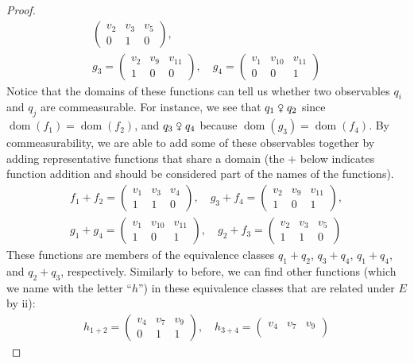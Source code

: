 \documentclass{scrartcl}
\DeclareMathOperator{\dom}{dom}
\newcommand{\com}{\mathrel{\venus}}
\begin{document}
\begin{examples}
\begin{enumerate}[(1)]
\begin{proof}
\begin{align*}
\begin{pmatrix}
v_2 & v_3 & v_5\\
0 & 1 & 0
\end{pmatrix},\\
g_3=\begin{pmatrix}
v_2 & v_9 & v_{11}\\
1 & 0 & 0
\end{pmatrix},\quad g_4=\begin{pmatrix}
v_1 & v_{10} & v_{11}\\
0 & 0 & 1
\end{pmatrix}
\end{align*}
Notice that the domains of these functions can tell us whether two observables $q_i$ and $q_j$ are commeasurable. For instance, we see that $q_1\com q_2$ since $\dom(f_1)=\dom(f_2)$, and $q_3\com q_4$ because $\dom(g_3)=\dom(f_4)$. By commeasurability, we are able to add some of these observables together by adding representative functions that share a domain (the $+$ below indicates function addition and should be considered part of the names of the functions).
\begin{align*}
f_1+f_2=\begin{pmatrix}
v_1 & v_3 & v_4\\
1 & 1 & 0
\end{pmatrix},\quad g_3+f_4=\begin{pmatrix}
v_2 & v_9 & v_{11}\\
1 & 0 & 1
\end{pmatrix},\\
g_1+g_4=\begin{pmatrix}
v_1 & v_{10} & v_{11}\\
1 & 0 & 1
\end{pmatrix},\quad g_2+f_3=\begin{pmatrix}
v_2 & v_3 & v_5\\
1 & 1 & 0
\end{pmatrix}
\end{align*}
These functions are members of the equivalence classes $q_1+q_2$, $q_3+q_4$, $q_1+q_4$, and $q_2+q_3$, respectively. Similarly to before, we can find other functions (which we name with the letter ``$h$'') in these equivalence classes that are related under $E$ by ii):
\begin{align*}
h_{1+2}=\begin{pmatrix}
v_4 & v_7 & v_9\\
0 & 1 & 1
\end{pmatrix},\quad h_{3+4}=\begin{pmatrix}
v_4 & v_7 & v_9\\

\end{pmatrix}
\end{align*}
\end{proof}
\end{enumerate}
\end{examples}
\end{document}
